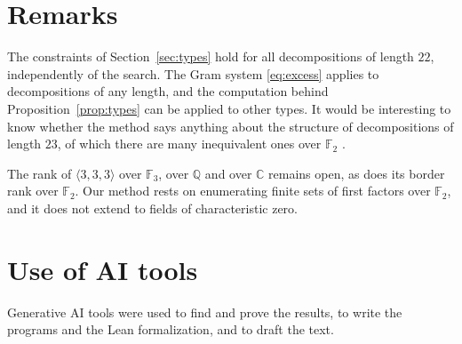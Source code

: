 \documentclass[11pt]{amsart}
\theoremstyle{definition}
\theoremstyle{remark}
\numberwithin{equation}{section}
\newcommand{\F}{\mathbb{F}_2}
\newcommand{\mm}{\langle 3,3,3\rangle}
\begin{document}
\section{Remarks}\label{sec:remarks}

The constraints of Section~\ref{sec:types} hold for all decompositions of length $22$, independently of the search. The Gram system \eqref{eq:excess} applies to decompositions of any length, and the computation behind Proposition~\ref{prop:types} can be applied to other types. It would be interesting to know whether the method says anything about the structure of decompositions of length $23$, of which there are many inequivalent ones over $\F$ \cite{CBH11,HKS21}.

The rank of $\mm$ over $\mathbb{F}_3$, over $\mathbb{Q}$ and over $\mathbb{C}$ remains open, as does its border rank over $\F$. Our method rests on enumerating finite sets of first factors over $\F$, and it does not extend to fields of characteristic zero.

\section*{Use of AI tools}
Generative AI tools were used to find and prove the results, to write the programs and the Lean formalization, and to draft the text.
\end{document}
